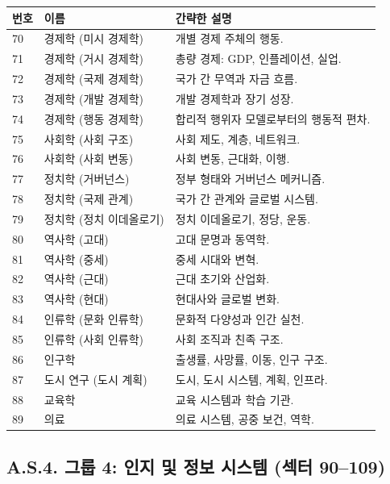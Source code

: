 \documentclass[13pt,a4paper]{article}
\begin{document}
	\begin{longtable}{|p{0.9cm}|p{6.0cm}|p{8.6cm}|}
		\hline
		\textbf{번호} & \textbf{이름} & \textbf{간략한 설명} \\
		\hline
		\endhead
		70 & 경제학 (미시 경제학) & 개별 경제 주체의 행동. \\
		\hline
		71 & 경제학 (거시 경제학) & 총량 경제: GDP, 인플레이션, 실업. \\
		\hline
		72 & 경제학 (국제 경제학) & 국가 간 무역과 자금 흐름. \\
		\hline
		73 & 경제학 (개발 경제학) & 개발 경제학과 장기 성장. \\
		\hline
		74 & 경제학 (행동 경제학) & 합리적 행위자 모델로부터의 행동적 편차. \\
		\hline
		75 & 사회학 (사회 구조) & 사회 제도, 계층, 네트워크. \\
		\hline
		76 & 사회학 (사회 변동) & 사회 변동, 근대화, 이행. \\
		\hline
		77 & 정치학 (거버넌스) & 정부 형태와 거버넌스 메커니즘. \\
		\hline
		78 & 정치학 (국제 관계) & 국가 간 관계와 글로벌 시스템. \\
		\hline
		79 & 정치학 (정치 이데올로기) & 정치 이데올로기, 정당, 운동. \\
		\hline
		80 & 역사학 (고대) & 고대 문명과 동역학. \\
		\hline
		81 & 역사학 (중세) & 중세 시대와 변혁. \\
		\hline
		82 & 역사학 (근대) & 근대 초기와 산업화. \\
		\hline
		83 & 역사학 (현대) & 현대사와 글로벌 변화. \\
		\hline
		84 & 인류학 (문화 인류학) & 문화적 다양성과 인간 실천. \\
		\hline
		85 & 인류학 (사회 인류학) & 사회 조직과 친족 구조. \\
		\hline
		86 & 인구학 & 출생률, 사망률, 이동, 인구 구조. \\
		\hline
		87 & 도시 연구 (도시 계획) & 도시, 도시 시스템, 계획, 인프라. \\
		\hline
		88 & 교육학 & 교육 시스템과 학습 기관. \\
		\hline
		89 & 의료 & 의료 시스템, 공중 보건, 역학. \\
		\hline
	\end{longtable}
	
	\subsection*{A.S.4. 그룹 4: 인지 및 정보 시스템 (섹터 90--109)}
	
\end{document}
